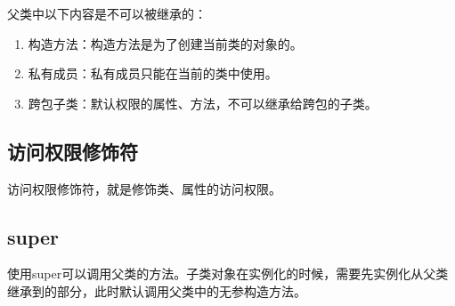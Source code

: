 父类中以下内容是不可以被继承的：

\begin{enumerate}
	\item 构造方法：构造方法是为了创建当前类的对象的。
	\item 私有成员：私有成员只能在当前的类中使用。
	\item 跨包子类：默认权限的属性、方法，不可以继承给跨包的子类。
\end{enumerate}

\vspace{0.5cm}

\subsection{访问权限修饰符}

访问权限修饰符，就是修饰类、属性的访问权限。

\begin{table}[H]
	\centering
	\caption{访问权限修饰符}
\end{table}

\vspace{0.5cm}

\subsection{super}

使用super可以调用父类的方法。子类对象在实例化的时候，需要先实例化从父类继承到的部分，此时默认调用父类中的无参构造方法。\\

